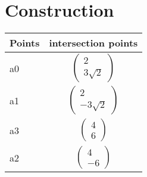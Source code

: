\documentclass[journal,10pt,twocolumn]{article}
\newcommand{\myvec}[1]{\ensuremath{\begin{pmatrix}#1\end{pmatrix}}}
\begin{document}
\section*{\large Construction}

{
\setlength\extrarowheight{5pt}
\begin{tabular}{|l|c|}
    \hline 
    \textbf{Points} & \textbf{intersection points} \\ \hline
   a0 & $\myvec{
   2\\
   3\sqrt{2}
   } $ \\\hline
   a1 & $\myvec{
   2\\
   -3\sqrt{2}
   } $ \\\hline
    
   a3 & $\myvec{
   4\\
   6
   } $ \\\hline
   a2 & $\myvec{
   4\\
   -6
   } $ \\\hline
      
      \end{tabular}
}
\end{document}
